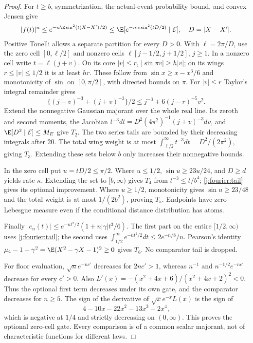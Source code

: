 \begin{proof}
For $t\ge b$, symmetrization, the actual-event probability bound,
and convex Jensen give
\[
 |f(t)|^n\le e^{-n\E\sin^2(t(X-X')/2)}
 \le\E[e^{-n\alpha\sin^2(tD/2)}\mid\mathcal E],
 \quad D=|X-X'|.
\]
Positive Tonelli allows a separate partition for every $D>0$.
With $\ell=2\pi/D$, use the zero cell $[0,\ell/2]$ and nonzero
cells $\ell[j-1/2,j+1/2]$, $j\ge1$. In a nonzero cell write
$t=\ell(j+v)$. On its core $|v|\le r$,
$|\sin\pi v|\ge h|v|$; on its wings $r\le|v|\le1/2$ it is
at least $hr$. These follow from $\sin x\ge x-x^3/6$ and
monotonicity of $\sin$ on $[0,\pi/2]$, with directed bounds on $\pi$.
For $|v|\le r$ Taylor's integral remainder gives
\[
 \{(j-v)^{-3}+(j+v)^{-3}\}/2
 \le j^{-3}+6(j-r)^{-5}v^2.
\]
Extend the nonnegative Gaussian majorant over the whole real line.
Its zeroth and second moments, the Jacobian
$t^{-3}dt=D^2(4\pi^2)^{-1}(j+v)^{-3}dv$, and
$\E[D^2\mid\mathcal E]\le M_E$ give $T_2$.
The two series tails are bounded by their decreasing integrals after
20. The total wing weight is at most
$\int_{\ell/2}^\infty t^{-3}dt=D^2/(2\pi^2)$, giving $T_3$.
Extending these sets below $b$ only increases their nonnegative bounds.

In the zero cell put $u=tD/2\le\pi/2$. Where $u\le1/2$,
$\sin u\ge23u/24$, and $D\ge d$ yields rate $\kappa$.
Extending the set to $[b,\infty)$ gives $T_4$ from
$t^{-3}\le t/b^4$; \eqref{j:fourier:tail} gives its optional improvement.
Where $u\ge1/2$, monotonicity gives $\sin u\ge23/48$ and the total
weight is at most $1/(2b^2)$, proving $T_5$. Endpoints have zero
Lebesgue measure even if the conditional distance distribution has atoms.

Finally $|e_n(t)|\le e^{-nt^2/2}(1+n|\gamma|t^3/6)$.
The first part on the entire $[1/2,\infty)$ uses
\eqref{j:fourier:tail}; the second uses
$\int_{1/2}^\infty e^{-nt^2/2}dt\le2e^{-n/8}/n$.
Pearson's identity $\mu_4-1-\gamma^2=\E(X^2-\gamma X-1)^2\ge0$
gives $T_6$. No comparator tail is dropped.

For floor evaluation, $\sqrt n e^{-nc'}$ decreases for $2nc'>1$,
whereas $n^{-1}$ and $n^{-1/2}e^{-nc'}$ decrease for every $c'>0$.
Also $L'(x)=-(x^2+4x+6)/(x^2+4x+2)^2<0$.
Thus the optional first term decreases under its own gate, and the
comparator decreases for $n\ge5$. The sign of the derivative of
$\sqrt{x}e^{-x}L(x)$ is the sign of
\[
 4-10x-22x^2-13x^3-2x^4,
\]
which is negative at $1/4$ and strictly decreasing on $(0,\infty)$.
This proves the optional zero-cell gate. Every comparison is of a common
scalar majorant, not of characteristic functions for different laws.
\end{proof}

